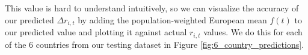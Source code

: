\documentclass[11pt]{article}
\begin{document}
This value is hard to understand intuitively, so we can visualize the accuracy of our predicted $\Delta r_{i,t}$ by adding the population-weighted European mean $f(t)$ to our predicted value and plotting it against actual $r_{i,t}$ values. We do this for each of the 6 countries from our testing dataset in Figure \ref{fig:6_country_predictions}.

\begin{figure}[!hbt]
    \centering
    \hfil
    \hfil
    \hfil
    \hfil

\end{figure}
\end{document}
